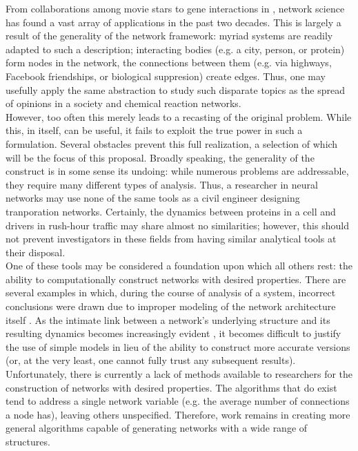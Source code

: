 \documentclass[11pt]{article}
\begin{document}
\indent From collaborations among movie stars \cite{Barabasi1999} to gene interactions in  \cite{Dreze2009}, network science has found a vast array of applications in the past two decades. This is largely a result of the generality of the network framework: myriad systems are readily adapted to such a description; interacting bodies (e.g. a city, person, or protein) form nodes in the network, the connections between them (e.g. via highways, Facebook friendships, or biological suppresion) create edges. Thus, one may usefully apply the same abstraction to study such disparate topics as the spread of opinions in a society and chemical reaction networks. \vspace{1mm}\\
\indent However, too often this merely leads to a recasting of the original problem. While this, in itself, can be useful, it fails to exploit the true power in such a formulation. Several obstacles prevent this full realization, a selection of which will be the focus of this proposal. Broadly speaking, the generality of the construct is in some sense its undoing: while numerous problems are addressable, they require many different types of analysis. Thus, a researcher in neural networks may use none of the same tools as a civil engineer designing tranporation networks. Certainly, the dynamics between proteins in a cell and drivers in rush-hour traffic may share almost no similarities; however, this should not prevent investigators in these fields from having similar analytical tools at their disposal.\vspace{1mm}\\ %
\indent One of these tools may be considered a foundation upon which all others rest: the ability to computationally construct networks with desired properties. There are several examples in which, during the course of analysis of a system, incorrect conclusions were drawn due to improper modeling of the network architecture itself \cite{theinternetisscalefree,smallworld,etc.} \cite{Watts1998}. As the intimate link between a network's underlying structure and its resulting dynamics becomes increasingly evident \cite{Barabasi1999} \cite{Barzel2013}, it becomes difficult to justify the use of simple models in lieu of the ability to construct more accurate versions (or, at the very least, one cannot fully trust any subsequent results). Unfortunately, there is currently a lack of methods available to researchers for the construction of networks with desired properties. The algorithms that do exist tend to address a single network variable (e.g. the average number of connections a node has), leaving others unspecified. Therefore, work remains in creating more general algorithms capable of generating networks with a wide range of structures.\vspace{1mm}\\
\end{document}
